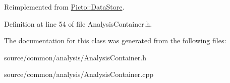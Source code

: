 Reimplemented from \hyperlink{class_picto_1_1_data_store_a1e5bb3fb88fcfaa2a17920a7457bcbe9}{Picto\-::\-Data\-Store}.



Definition at line 54 of file Analysis\-Container.\-h.



The documentation for this class was generated from the following files\-:\begin{DoxyCompactItemize}
\item 
source/common/analysis/Analysis\-Container.\-h\item 
source/common/analysis/Analysis\-Container.\-cpp\end{DoxyCompactItemize}
